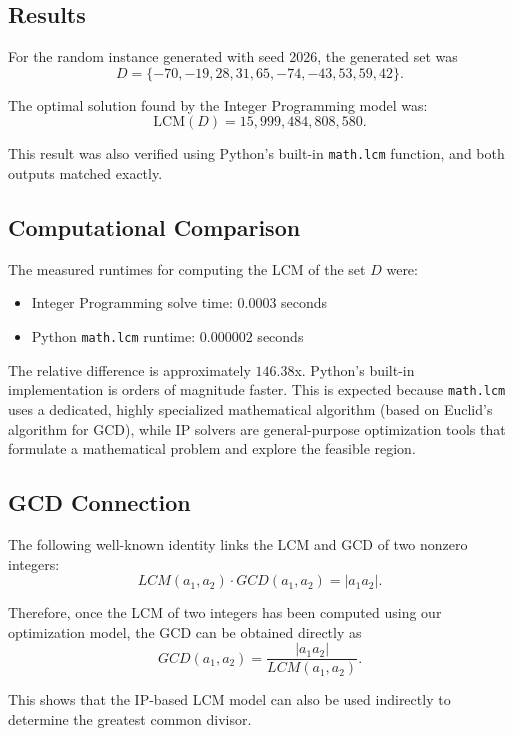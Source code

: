 \documentclass[11pt,a4paper]{article}
\begin{document}
\subsection*{Results}

For the random instance generated with seed 2026, the generated set was
\[
D = \{-70, -19, 28, 31, 65, -74, -43, 53, 59, 42\}.
\]

The optimal solution found by the Integer Programming model was:
\[
\mathrm{LCM}(D) = 15{,}999{,}484{,}808{,}580.
\]

This result was also verified using Python's built-in \texttt{math.lcm} function, and both outputs matched exactly.

\subsection*{Computational Comparison}

The measured runtimes for computing the LCM of the set $D$ were:
\begin{itemize}
    \item Integer Programming solve time: $0.0003$ seconds
    \item Python \texttt{math.lcm} runtime: $0.000002$ seconds
\end{itemize}

The relative difference is approximately $146.38$x. Python's built-in implementation is orders of magnitude faster. This is expected because \texttt{math.lcm} uses a dedicated, highly specialized mathematical algorithm (based on Euclid's algorithm for GCD), while IP solvers are general-purpose optimization tools that formulate a mathematical problem and explore the feasible region.

\subsection*{GCD Connection}

The following well-known identity links the LCM and GCD of two nonzero integers:
\[
LCM(a_1,a_2)\cdot GCD(a_1,a_2)=|a_1a_2|.
\]

Therefore, once the LCM of two integers has been computed using our optimization model, the GCD can be obtained directly as
\[
GCD(a_1,a_2)=\frac{|a_1a_2|}{LCM(a_1,a_2)}.
\]

This shows that the IP-based LCM model can also be used indirectly to determine the greatest common divisor.

\end{document}

